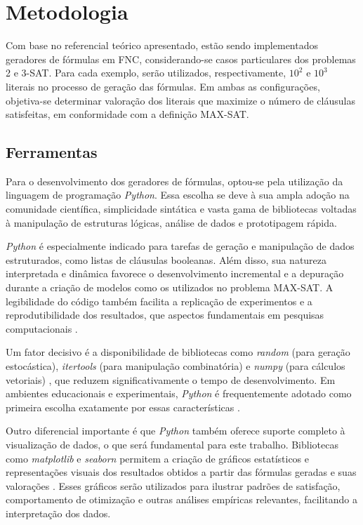 \chapter{Metodologia}
\label{chap:metodo}

Com base no referencial teórico apresentado, estão sendo implementados geradores de fórmulas em FNC, considerando-se casos particulares dos problemas 2 e 3-SAT. Para cada exemplo, serão utilizados, respectivamente, $10^2$ e $10^3$ literais no processo de geração das fórmulas. Em ambas as configurações, objetiva-se determinar valoração dos literais que maximize o número de cláusulas satisfeitas, em conformidade com a definição MAX-SAT.

\section{Ferramentas}

Para o desenvolvimento dos geradores de fórmulas, optou-se pela utilização da linguagem de programação \textit{Python}. Essa escolha se deve à sua ampla adoção na comunidade científica, simplicidade sintática e vasta gama de bibliotecas voltadas à manipulação de estruturas lógicas, análise de dados e prototipagem rápida.

\textit{Python} é especialmente indicado para tarefas de geração e manipulação de dados estruturados, como listas de cláusulas booleanas. Além disso, sua natureza interpretada e dinâmica favorece o desenvolvimento incremental e a depuração durante a criação de modelos como os utilizados no problema MAX-SAT. A legibilidade do código também facilita a replicação de experimentos e a reprodutibilidade dos resultados, que aspectos fundamentais em pesquisas computacionais \cite{millman2011python}.

Um fator decisivo é a disponibilidade de bibliotecas como \textit{random} (para geração estocástica), \textit{itertools} (para manipulação combinatória) e \textit{numpy} (para cálculos vetoriais) \cite{mckinney2012python}, que reduzem significativamente o tempo de desenvolvimento. Em ambientes educacionais e experimentais, \textit{Python} é frequentemente adotado como primeira escolha exatamente por essas características \cite{millman2011python}.

Outro diferencial importante é que \textit{Python} também oferece suporte completo à visualização de dados, o que será fundamental para este trabalho. Bibliotecas como \textit{matplotlib} e \textit{seaborn} permitem a criação de gráficos estatísticos e representações visuais dos resultados obtidos a partir das fórmulas geradas e suas valorações \cite{mckinney2012python}. Esses gráficos serão utilizados para ilustrar padrões de satisfação, comportamento de otimização e outras análises empíricas relevantes, facilitando a interpretação dos dados.

